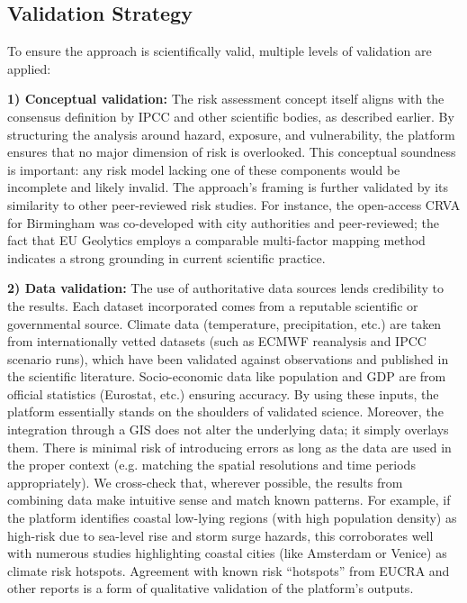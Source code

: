 \documentclass[10pt, conference]{IEEEtran}
\begin{document}
\subsection{Validation Strategy}
To ensure the approach is scientifically valid, multiple levels of validation are applied:

\textbf{1) Conceptual validation:} The risk assessment concept itself aligns with the consensus definition by IPCC and other scientific bodies, as described earlier. By structuring the analysis around hazard, exposure, and vulnerability, the platform ensures that no major dimension of risk is overlooked. This conceptual soundness is important: any risk model lacking one of these components would be incomplete and likely invalid. The approach’s framing is further validated by its similarity to other peer-reviewed risk studies. For instance, the open-access CRVA for Birmingham was co-developed with city authorities and peer-reviewed; the fact that EU Geolytics employs a comparable multi-factor mapping method indicates a strong grounding in current scientific practice.

\textbf{2) Data validation:} The use of authoritative data sources lends credibility to the results. Each dataset incorporated comes from a reputable scientific or governmental source. Climate data (temperature, precipitation, etc.) are taken from internationally vetted datasets (such as ECMWF reanalysis and IPCC scenario runs), which have been validated against observations and published in the scientific literature. Socio-economic data like population and GDP are from official statistics (Eurostat, etc.) ensuring accuracy. By using these inputs, the platform essentially stands on the shoulders of validated science. Moreover, the integration through a GIS does not alter the underlying data; it simply overlays them. There is minimal risk of introducing errors as long as the data are used in the proper context (e.g. matching the spatial resolutions and time periods appropriately). We cross-check that, wherever possible, the results from combining data make intuitive sense and match known patterns. For example, if the platform identifies coastal low-lying regions (with high population density) as high-risk due to sea-level rise and storm surge hazards, this corroborates well with numerous studies highlighting coastal cities (like Amsterdam or Venice) as climate risk hotspots. Agreement with known risk “hotspots” from EUCRA and other reports is a form of qualitative validation of the platform’s outputs.
\end{document}
